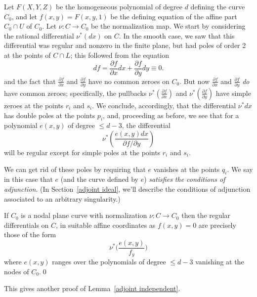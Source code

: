 Let $F(X,Y,Z)$ be the homogeneous polynomial of degree $d$ defining the curve $C_0$, and let $f(x,y) = F(x,y,1)$ be the defining equation of the affine part $C_0 \cap U$ of $C_0$. Let $\nu: C\to C_0$ be the normalization map. We start by considering the rational differential $\nu^*(dx)$ on $C$. In the smooth case, we saw that this differential was regular and nonzero in the finite plane, but had poles of order 2 at the points of $C \cap L$; this followed from the equation
$$
 df = \frac{\partial f}{\partial x}dx + \frac{\partial f}{\partial y}dy \equiv 0.
 $$
and the fact that $\frac{\partial f}{\partial x}$ and $\frac{\partial f}{\partial y}$ have no common zeroes on $C_0$. But now $\frac{\partial f}{\partial x}$ and $\frac{\partial f}{\partial y}$ \emph{do} have common zeroes; specifically, the pullbacks $\nu^*(\frac{\partial f}{\partial x})$ and $\nu^*(\frac{\partial f}{\partial y})$ have simple zeroes at the points $r_i$ and $s_i$. We conclude, accordingly, that the differential $\nu^*dx$ has double poles at the points $p_i$, 
and, proceeding as before, we see that for a polynomial $e(x,y)$ of degree $\leq d-3$, the differential
$$
\nu^*( \frac{e(x,y)dx}{\partial f/\partial y})
$$
will be regular except for simple poles at the points $r_i$ and $s_i$.

We can get rid of these poles by requiring that $e$ vanishes at the points $q_i$. We say in this case that $e$ (and the curve defined by $e$) \emph{satisfies the conditions of adjunction}. (In Section~\ref{adjoint ideal}, we'll describe the  conditions of adjunction associated to an arbitrary singularity.) 

\begin{theorem}
If $C_{0}$ is a nodal plane curve with normalization $\nu: C\to C_{0}$
then the  regular differentials on  $C$, in suitable affine coordinates as $f(x,y) = 0$ 
 are precisely those of the form
 $$
\nu^{*}\biggl( \frac{e(x,y)}{f_{y}}\biggr)
$$
where 
$e(x,y)$ ranges over the polynomials of degree $\leq d-3$
vanishing at the nodes of $C_{0}.$\qed 
\end{theorem}

This gives another proof of Lemma~\ref{adjoint independent}.


